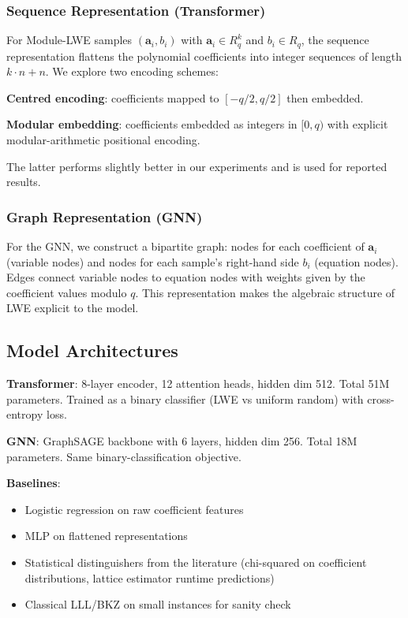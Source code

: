 \documentclass[sigconf,nonacm]{acmart}
\begin{document}
\subsubsection{Sequence Representation (Transformer)}

For Module-LWE samples $(\mathbf{a}_i, b_i)$ with $\mathbf{a}_i \in R_q^k$
and $b_i \in R_q$, the sequence representation flattens the polynomial
coefficients into integer sequences of length $k \cdot n + n$. We
explore two encoding schemes:

\textbf{Centred encoding}: coefficients mapped to $[-q/2, q/2]$ then
embedded.

\textbf{Modular embedding}: coefficients embedded as integers in $[0,q)$
with explicit modular-arithmetic positional encoding.

The latter performs slightly better in our experiments and is used
for reported results.

\subsubsection{Graph Representation (GNN)}

For the GNN, we construct a bipartite graph: nodes for each
coefficient of $\mathbf{a}_i$ (variable nodes) and nodes for each
sample's right-hand side $b_i$ (equation nodes). Edges connect
variable nodes to equation nodes with weights given by the
coefficient values modulo $q$. This representation makes the
algebraic structure of LWE explicit to the model.

\subsection{Model Architectures}

\textbf{Transformer}: 8-layer encoder, 12 attention heads, hidden
dim 512. Total 51M parameters. Trained as a binary classifier
(LWE vs uniform random) with cross-entropy loss.

\textbf{GNN}: GraphSAGE backbone with 6 layers, hidden dim 256.
Total 18M parameters. Same binary-classification objective.

\textbf{Baselines}:
\begin{itemize}
  \item Logistic regression on raw coefficient features
  \item MLP on flattened representations
  \item Statistical distinguishers from the literature
        (chi-squared on coefficient distributions, lattice estimator
        runtime predictions)
  \item Classical LLL/BKZ on small instances for sanity check
\end{itemize}
\end{document}

